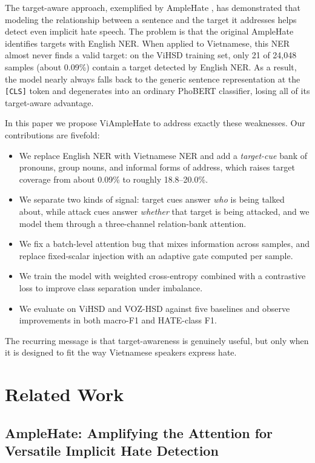 \documentclass[11pt]{article}
\begin{document}
The target-aware approach, exemplified by AmpleHate \citep{amplehate}, has demonstrated that modeling the relationship between a sentence and the target it addresses helps detect even implicit hate speech. The problem is that the original AmpleHate identifies targets with English NER. When applied to Vietnamese, this NER almost never finds a valid target: on the ViHSD training set, only 21 of 24{,}048 samples (about 0.09\%) contain a target detected by English NER. As a result, the model nearly always falls back to the generic sentence representation at the \texttt{[CLS]} token and degenerates into an ordinary PhoBERT classifier, losing all of its target-aware advantage.

In this paper we propose ViAmpleHate to address exactly these weaknesses. Our contributions are fivefold:
\begin{itemize}
  \item We replace English NER with Vietnamese NER and add a \emph{target-cue} bank of pronouns, group nouns, and informal forms of address, which raises target coverage from about 0.09\% to roughly 18.8--20.0\%.
  \item We separate two kinds of signal: target cues answer \emph{who} is being talked about, while attack cues answer \emph{whether} that target is being attacked, and we model them through a three-channel relation-bank attention.
  \item We fix a batch-level attention bug that mixes information across samples, and replace fixed-scalar injection with an adaptive gate computed per sample.
  \item We train the model with weighted cross-entropy combined with a contrastive loss to improve class separation under imbalance.
  \item We evaluate on ViHSD and VOZ-HSD against five baselines and observe improvements in both macro-F1 and HATE-class F1.
\end{itemize}
The recurring message is that target-awareness is genuinely useful, but only when it is designed to fit the way Vietnamese speakers express hate.

\section{Related Work}

\subsection{AmpleHate: Amplifying the Attention for Versatile Implicit Hate Detection}
\end{document}
